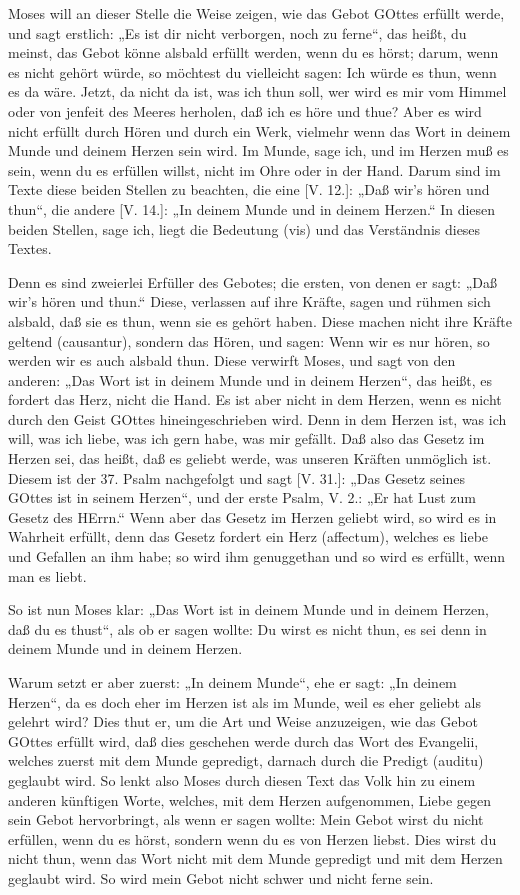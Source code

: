 Moses will an dieser Stelle die Weise zeigen, wie das Gebot GOttes erfüllt werde, und sagt erstlich: „Es ist dir nicht verborgen, noch zu ferne“, das heißt, du meinst, das Gebot könne alsbald erfüllt werden, wenn du es hörst; darum, wenn es nicht gehört würde, so möchtest du vielleicht sagen: Ich würde es thun, wenn es da wäre. Jetzt, da nicht da ist, was ich thun soll, wer wird es mir vom Himmel oder von jenfeit des Meeres herholen, daß ich es höre und thue? Aber es wird nicht erfüllt durch Hören und durch ein Werk, vielmehr wenn das Wort in deinem Munde und deinem Herzen sein wird. Im Munde, sage ich, und im Herzen muß es sein, wenn du es erfüllen willst, nicht im Ohre oder in der Hand. Darum sind im Texte diese beiden Stellen zu beachten, die eine [V. 12.]: „Daß wir’s hören und thun“, die andere [V. 14.]: „In deinem Munde und in deinem Herzen.“ In diesen beiden Stellen, sage ich, liegt die Bedeutung (vis) und das Verständnis dieses Textes.

Denn es sind zweierlei Erfüller des Gebotes; die ersten, von denen er sagt: „Daß wir’s hören und thun.“ Diese, verlassen auf ihre Kräfte, sagen und rühmen sich alsbald, daß sie es thun, wenn sie es gehört haben. Diese machen nicht ihre Kräfte geltend (causantur), sondern das Hören, und sagen: Wenn wir es nur hören, so werden wir es auch alsbald thun. Diese verwirft Moses, und sagt von den anderen: „Das Wort ist in deinem Munde und in deinem Herzen“, das heißt, es fordert das Herz, nicht die Hand. Es ist aber nicht in dem Herzen, wenn es nicht durch den Geist GOttes hineingeschrieben wird. Denn in dem Herzen ist, was ich will, was ich liebe, was ich gern habe, was mir gefällt. Daß also das Gesetz im Herzen sei, das heißt, daß es geliebt werde, was unseren Kräften unmöglich ist. Diesem ist der 37. Psalm nachgefolgt und sagt [V. 31.]: „Das Gesetz seines GOttes ist in seinem Herzen“, und der erste Psalm, V. 2.: „Er hat Lust zum Gesetz des HErrn.“ Wenn aber das Gesetz im Herzen geliebt wird, so wird es in Wahrheit erfüllt, denn das Gesetz fordert ein Herz (affectum), welches es liebe und Gefallen an ihm habe; so wird ihm genuggethan und so wird es erfüllt, wenn man es liebt.

So ist nun Moses klar: „Das Wort ist in deinem Munde und in deinem Herzen, daß du es thust“, als ob er sagen wollte: Du wirst es nicht thun, es sei denn in deinem Munde und in deinem Herzen.

Warum setzt er aber zuerst: „In deinem Munde“, ehe er sagt: „In deinem Herzen“, da es doch eher im Herzen ist als im Munde, weil es eher geliebt als gelehrt wird? Dies thut er, um die Art und Weise anzuzeigen, wie das Gebot GOttes erfüllt wird, daß dies geschehen werde durch das Wort des Evangelii, welches zuerst mit dem Munde gepredigt, darnach durch die Predigt (auditu) geglaubt wird. So lenkt also Moses durch diesen Text das Volk hin zu einem anderen künftigen Worte, welches, mit dem Herzen aufgenommen, Liebe gegen sein Gebot hervorbringt, als wenn er sagen wollte: Mein Gebot wirst du nicht erfüllen, wenn du es hörst, sondern wenn du es von Herzen liebst. Dies wirst du nicht thun, wenn das Wort nicht mit dem Munde gepredigt und mit dem Herzen geglaubt wird. So wird mein Gebot nicht schwer und nicht ferne sein.


